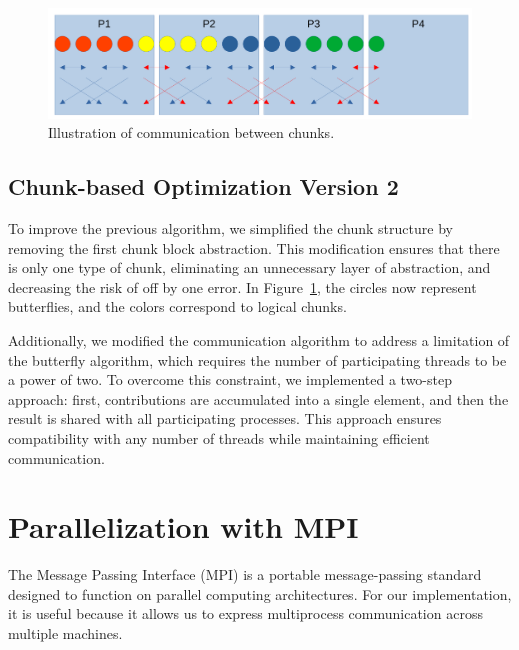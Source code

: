 \documentclass[10pt]{article}
\begin{document}
\begin{multicols}{2}
\begin{figure}[H]
  \includegraphics[scale=0.21]{img/chunks.png}
  \centering
  \caption{Illustration of communication between chunks.}
  \label{fig:chunks}
\end{figure}

\subsection*{Chunk-based Optimization Version 2}

To improve the previous algorithm, we simplified the chunk structure by removing the first chunk block abstraction.
This modification ensures that there is only one type of chunk, eliminating an unnecessary layer of abstraction, and decreasing the risk of off by one error.
In Figure~\ref{fig:chunks}, the circles now represent butterflies, and the colors correspond to logical chunks.

Additionally, we modified the communication algorithm to address a limitation of the butterfly algorithm, which requires the number of participating threads to be a power of two.
To overcome this constraint, we implemented a two-step approach: first, contributions are accumulated into a single element, and then the result is shared with all participating processes.
This approach ensures compatibility with any number of threads while maintaining efficient communication.


\section{Parallelization with MPI}

The Message Passing Interface (MPI) is a portable message-passing standard designed to function on parallel computing architectures.
For our implementation, it is useful because it allows us to express multiprocess communication across multiple machines.


\end{multicols}
\end{document}
